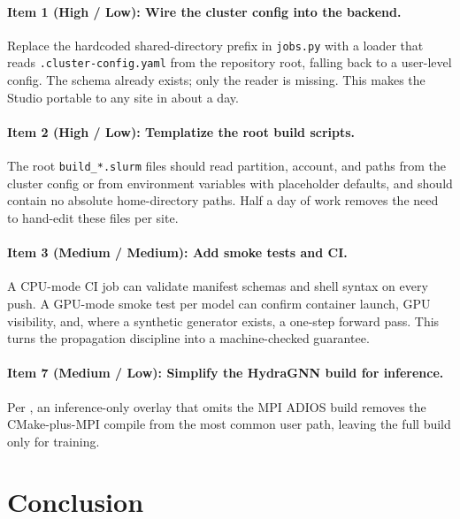 \documentclass[11pt]{article}
\newcommand{\file}[1]{\texttt{\small #1}}
\begin{document}
\paragraph{Item 1 (High / Low): Wire the cluster config into the backend.}
Replace the hardcoded shared-directory prefix in \file{jobs.py} with a loader that
reads \file{.cluster-config.yaml} from the repository root, falling back to a
user-level config. The schema already exists; only the reader is missing. This makes
the Studio portable to any site in about a day.

\paragraph{Item 2 (High / Low): Templatize the root build scripts.}
The root \file{build\_*.slurm} files should read partition, account, and paths from the
cluster config or from environment variables with placeholder defaults, and should
contain no absolute home-directory paths. Half a day of work removes the need to hand-edit
these files per site.

\paragraph{Item 3 (Medium / Medium): Add smoke tests and CI.}
A CPU-mode CI job can validate manifest schemas and shell syntax on every push. A
GPU-mode smoke test per model can confirm container launch, GPU visibility, and, where a
synthetic generator exists, a one-step forward pass. This turns the propagation
discipline into a machine-checked guarantee.

\paragraph{Item 7 (Medium / Low): Simplify the HydraGNN build for inference.}
Per , an inference-only overlay that omits the MPI ADIOS build removes
the CMake-plus-MPI compile from the most common user path, leaving the full build only
for training.

\section{Conclusion}
\label{sec:conclusion}
\end{document}
